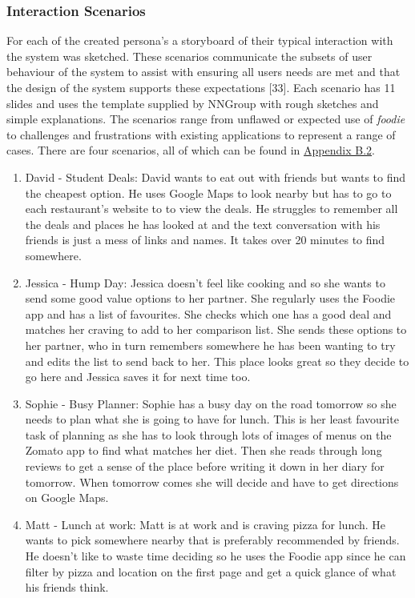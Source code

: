 \documentclass[a4 paper, 12pt]{article}
\begin{document}
    \subsubsection{Interaction Scenarios}
    For each of the created persona's a storyboard of their typical interaction with the system was sketched. These scenarios communicate the subsets of user behaviour of the system to assist with ensuring all users needs are met and that the design of the system supports these expectations [33]. Each scenario has 11 slides and uses the template supplied by NNGroup with rough sketches and simple explanations. The scenarios range from unflawed or expected use of \textit{foodie} to challenges and frustrations with existing applications to represent a range of cases. There are four scenarios, all of which can be found in \hyperref[sec:B.2]{Appendix B.2}.
        \begin{enumerate}
            \item David - Student Deals: David wants to eat out with friends but wants to find the cheapest option. He uses Google Maps to look nearby but has to go to each restaurant's website to to view the deals. He struggles to remember all the deals and places he has looked at and the text conversation with his friends is just a mess of links and names. It takes over 20 minutes to find somewhere.
            \item Jessica - Hump Day: Jessica doesn't feel like cooking and so she wants to send some good value options to her partner. She regularly uses the Foodie app and has a list of favourites. She checks which one has a good deal and matches her craving to add to her comparison list. She sends these options to her partner, who in turn remembers somewhere he has been wanting to try and edits the list to send back to her. This place looks great so they decide to go here and Jessica saves it for next time too.
            \item Sophie - Busy Planner: Sophie has a busy day on the road tomorrow so she needs to plan what she is going to have for lunch. This is her least favourite task of planning as she has to look through lots of images of menus on the Zomato app to find what matches her diet. Then she reads through long reviews to get a sense of the place before writing it down in her diary for tomorrow. When tomorrow comes she will decide and have to get directions on Google Maps.
            \item Matt - Lunch at work: Matt is at work and is craving pizza for lunch. He wants to pick somewhere nearby that is preferably recommended by friends. He doesn't like to waste time deciding so he uses the Foodie app since he can filter by pizza and location on the first page and get a quick glance of what his friends think. 
        \end{enumerate}
\end{document}
